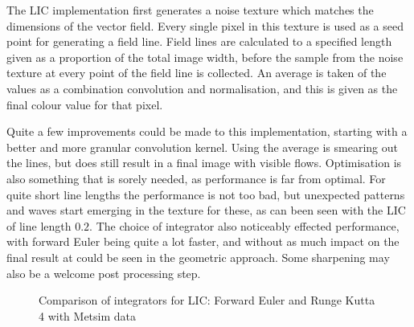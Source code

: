 \documentclass{article}
\begin{document}
The LIC implementation first generates a noise texture which matches the dimensions
of the vector field. Every single pixel in this texture is used as a seed point for
generating a field line. Field lines are calculated to a specified length given as
a proportion of the total image width, before
the sample from the noise texture at every point of the field line is collected. An
average is taken of the values as a combination convolution and normalisation, and
this is given as the final colour value for that pixel.

Quite a few improvements could be made to this implementation, starting with a better
and more granular convolution kernel. Using the average is smearing out the lines,
but does still result in a final image with visible flows. Optimisation is also something
that is sorely needed, as performance is far from optimal. For quite short line lengths
the performance is not too bad, but unexpected patterns and waves start emerging in the
texture for these, as can been seen with the LIC of line length $0.2$. The choice
of integrator also noticeably effected performance, with forward Euler being quite
a lot faster, and without as much impact on the final result at could be seen in
the geometric approach. Some sharpening may also be a welcome post processing step.

\begin{figure}
\caption{Comparison of integrators for LIC: Forward Euler and Runge Kutta 4 with Metsim data}
\end{figure}
\end{document}

